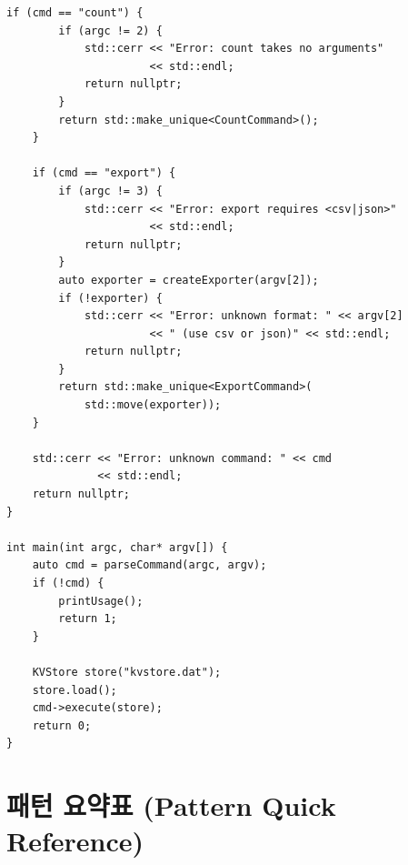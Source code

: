 \documentclass[11pt,a4paper]{book}
\newcommand{\file}[1]{\texttt{#1}}
\begin{document}
\begin{lstlisting}[style=cpp,title={\file{src/main.cpp}}]
    if (cmd == "count") {
        if (argc != 2) {
            std::cerr << "Error: count takes no arguments"
                      << std::endl;
            return nullptr;
        }
        return std::make_unique<CountCommand>();
    }

    if (cmd == "export") {
        if (argc != 3) {
            std::cerr << "Error: export requires <csv|json>"
                      << std::endl;
            return nullptr;
        }
        auto exporter = createExporter(argv[2]);
        if (!exporter) {
            std::cerr << "Error: unknown format: " << argv[2]
                      << " (use csv or json)" << std::endl;
            return nullptr;
        }
        return std::make_unique<ExportCommand>(
            std::move(exporter));
    }

    std::cerr << "Error: unknown command: " << cmd
              << std::endl;
    return nullptr;
}

int main(int argc, char* argv[]) {
    auto cmd = parseCommand(argc, argv);
    if (!cmd) {
        printUsage();
        return 1;
    }

    KVStore store("kvstore.dat");
    store.load();
    cmd->execute(store);
    return 0;
}
\end{lstlisting}

\chapter{패턴 요약표 (Pattern Quick Reference)}
\label{app:patterns}
\end{document}
